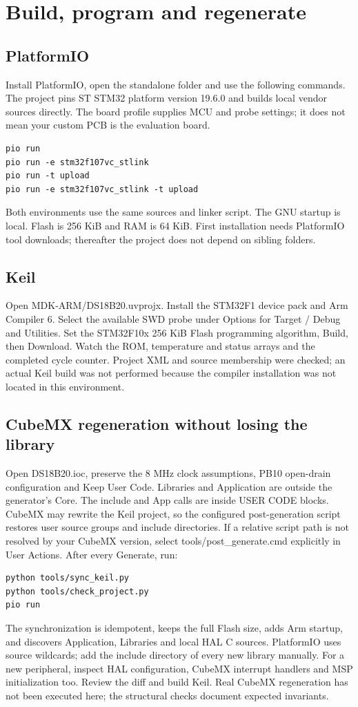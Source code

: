 \section{Build, program and regenerate}
\subsection{PlatformIO}
Install PlatformIO, open the standalone folder and use the following commands.
The project pins ST STM32 platform version 19.6.0 and builds local vendor sources
directly. The board profile supplies MCU and probe settings; it does not mean
your custom PCB is the evaluation board.
\begin{lstlisting}[language={}]
pio run
pio run -e stm32f107vc_stlink
pio run -t upload
pio run -e stm32f107vc_stlink -t upload
\end{lstlisting}
Both environments use the same sources and linker script. The GNU startup is
local. Flash is 256 KiB and RAM is 64 KiB. First installation needs PlatformIO
tool downloads; thereafter the project does not depend on sibling folders.

\subsection{Keil}
Open MDK-ARM/DS18B20.uvprojx. Install the STM32F1 device pack and Arm Compiler 6.
Select the available SWD probe under Options for Target / Debug and Utilities.
Set the STM32F10x 256 KiB Flash programming algorithm, Build, then Download.
Watch the ROM, temperature and status arrays and the completed cycle counter.
Project XML and source membership were checked; an actual Keil build was not
performed because the compiler installation was not located in this environment.

\subsection{CubeMX regeneration without losing the library}
Open DS18B20.ioc, preserve the 8 MHz clock assumptions, PB10 open-drain configuration
and Keep User Code. Libraries and Application are outside the generator's Core.
The include and App calls are inside USER CODE blocks. CubeMX may rewrite the
Keil project, so the configured post-generation script restores user source
groups and include directories. If a relative script path is not resolved by
your CubeMX version, select tools/post\_generate.cmd explicitly in User Actions.
After every Generate, run:
\begin{lstlisting}[language={}]
python tools/sync_keil.py
python tools/check_project.py
pio run
\end{lstlisting}
The synchronization is idempotent, keeps the full Flash size, adds Arm startup,
and discovers Application, Libraries and local HAL C sources. PlatformIO uses
source wildcards; add the include directory of every new library manually.
For a new peripheral, inspect HAL configuration, CubeMX interrupt handlers and
MSP initialization too. Review the diff and build Keil. Real CubeMX regeneration
has not been executed here; the structural checks document expected invariants.

